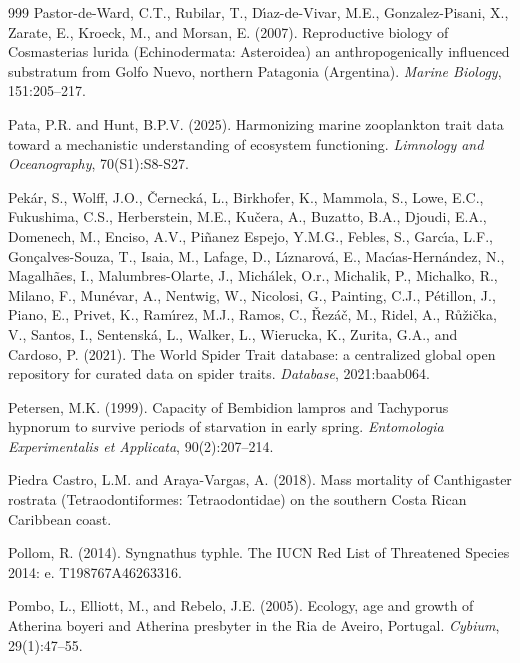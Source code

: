 \begin{thebibliography}{999}
Pastor-de-Ward, C.T., Rubilar, T., D{\'\i}az-de-Vivar, M.E., Gonzalez-Pisani, X., Zarate, E., Kroeck, M., and Morsan, E. (2007). Reproductive biology of Cosmasterias lurida (Echinodermata: Asteroidea) an anthropogenically influenced substratum from Golfo Nuevo, northern Patagonia (Argentina). \textit{Marine Biology}, 151:205--217.

Pata, P.R. and Hunt, B.P.V. (2025). Harmonizing marine zooplankton trait data toward a mechanistic understanding of ecosystem functioning. \textit{Limnology and Oceanography}, 70(S1):S8-S27.

Pek{\'a}r, S., Wolff, J.O., {\v C}erneck{\'a}, L., Birkhofer, K., Mammola, S., Lowe, E.C., Fukushima, C.S., Herberstein, M.E., Ku{\v c}era, A., Buzatto, B.A., Djoudi, E.A., Domenech, M., Enciso, A.V., Pi{\~n}anez Espejo, Y.M.G., Febles, S., Garc{\'\i}a, L.F., Gon{\c c}alves-Souza, T., Isaia, M., Lafage, D., L{\'\i}znarov{\'a}, E., Mac{\'\i}as-Hern{\'a}ndez, N., Magalh{\~a}es, I., Malumbres-Olarte, J., Mich{\'a}lek, O.r., Michalik, P., Michalko, R., Milano, F., Mun{\'e}var, A., Nentwig, W., Nicolosi, G., Painting, C.J., P{\'e}tillon, J., Piano, E., Privet, K., Ram{\'\i}rez, M.J., Ramos, C., {\v R}ez{\'a}{\v c}, M., Ridel, A., R{\r u}{\v z}i{\v c}ka, V., Santos, I., Sentensk{\'a}, L., Walker, L., Wierucka, K., Zurita, G.A., and Cardoso, P. (2021). The World Spider Trait database: a centralized global open repository for curated data on spider traits. \textit{Database}, 2021:baab064.

Petersen, M.K. (1999). Capacity of Bembidion lampros and Tachyporus hypnorum to survive periods of starvation in early spring. \textit{Entomologia Experimentalis et Applicata}, 90(2):207--214.

Piedra Castro, L.M. and Araya-Vargas, A. (2018). Mass mortality of Canthigaster rostrata (Tetraodontiformes: Tetraodontidae) on the southern Costa Rican Caribbean coast.

Pollom, R. (2014). Syngnathus typhle. The IUCN Red List of Threatened Species 2014: e. T198767A46263316.

Pombo, L., Elliott, M., and Rebelo, J.E. (2005). Ecology, age and growth of Atherina boyeri and Atherina presbyter in the Ria de Aveiro, Portugal. \textit{Cybium}, 29(1):47--55.


\end{thebibliography}
